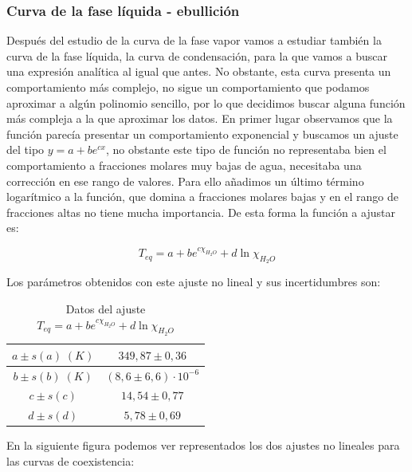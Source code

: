 \documentclass[a4paper,12pt,titlepage]{article}
\begin{document}
\subsubsection{Curva de la fase líquida - ebullición}

Después del estudio de la curva de la fase vapor vamos a estudiar también la curva de la fase líquida, la curva de condensación, para la que vamos a buscar una expresión analítica al igual que antes. No obstante, esta curva presenta un comportamiento más complejo, no sigue un comportamiento que podamos aproximar a algún polinomio sencillo, por lo que decidimos buscar alguna función más compleja a la que aproximar los datos. En primer lugar observamos que la función parecía presentar un comportamiento exponencial y buscamos un ajuste del tipo $y = a + be^{cx}$, no obstante este tipo de función no representaba bien el comportamiento a fracciones molares muy bajas de agua, necesitaba una corrección en ese rango de valores. Para ello añadimos un último término logarítmico a la función, que domina a fracciones molares bajas y en el rango de fracciones altas no tiene mucha importancia. De esta forma la función a ajustar es:

\begin{equation}
    T_{eq} = a + be^{c\chi_{H_2O}} + d\ln \chi_{H_2O}
\end{equation}

Los parámetros obtenidos con este ajuste no lineal y sus incertidumbres son:

\begin{table}[h!]
    \centering
    \begin{tabular}{|c|c|}
    \hline
    $a \pm s(a) \;(K)$ &  $349,87 \pm 0,36$\\ \hline
    $b\pm s(b) \; (K)$ & $(8,6 \pm 6,6) \cdot 10^{-6}$ \\ \hline
    $c \pm s(c)$ & $14,54 \pm 0,77$\\ \hline
    $d \pm s(d)$ & $5,78 \pm 0,69$ \\ \hline
    \end{tabular}
    \caption{Datos del ajuste $T_{eq}=a + be^{c\chi_{H_2O}} + d\ln \chi_{H_2O}$}
    \label{tab:my_label}
\end{table}

En la siguiente figura podemos ver representados los dos ajustes no lineales para las curvas de coexistencia:
\end{document}

